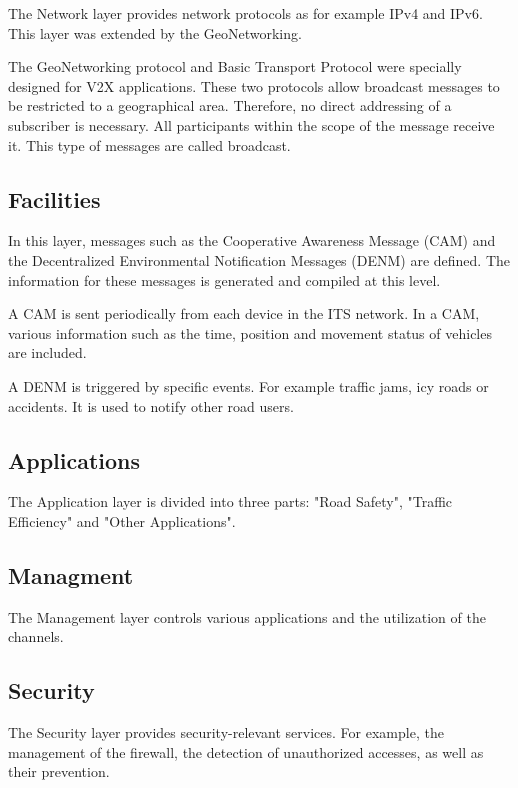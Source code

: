 The Network layer provides network protocols as for example IPv4 and IPv6. This layer was extended by the GeoNetworking. \cite{ETSI_EN_302_665}

The GeoNetworking protocol and Basic Transport Protocol were specially designed for V2X applications. These two protocols allow broadcast messages to be restricted to a geographical area. Therefore, no direct addressing of a subscriber is necessary. All participants within the scope of the message receive it. This type of messages are called broadcast. \cite{Mustafa}

\newpage

\subsection{Facilities}

In this layer, messages such as the Cooperative Awareness Message (CAM) and the Decentralized Environmental Notification Messages (DENM) are defined. The information for these messages is generated and compiled at this level.

A CAM is sent periodically from each device in the ITS network. In a CAM, various information such as the time, position and movement status of vehicles are included.

A DENM is triggered by specific events. For example traffic jams, icy roads or accidents. It is used to notify other road users. \cite{ETSI_EN_302_665} \cite{Mustafa}

\subsection{Applications}

The Application layer is divided into three parts: "Road Safety", "Traffic Efficiency" and "Other Applications". \cite{ETSI_EN_302_665}

\subsection{Managment}

The Management layer controls various applications and the utilization of the channels. \cite{Mustafa}

\subsection{Security}

The Security layer provides security-relevant services. For example, the management of the firewall, the detection of unauthorized accesses, as well as their prevention. \cite{Mustafa}

